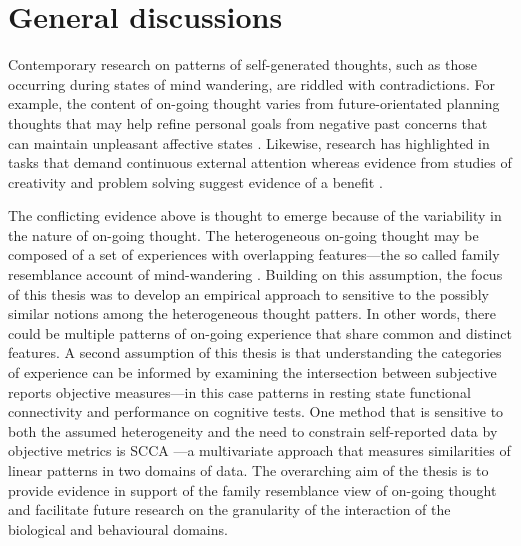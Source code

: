 \chapter{General discussions}
\label{ch:discussion}
Contemporary research on patterns of self-generated thoughts, such as those occurring during states of mind wandering, are riddled with contradictions. For example, the content of on-going thought varies from future-orientated planning thoughts that may help refine personal goals \cite{Medea2016} from negative past concerns that can maintain unpleasant affective states \cite{Killingsworth2010}. Likewise, research has highlighted in tasks that demand continuous external attention \cite{McVayJOEP2009,McVay2012} whereas evidence from studies of creativity and problem solving suggest evidence of a benefit \cite{Smeekens2016,Baird2012}. 

The conflicting evidence above is thought to emerge because of the variability in the nature of on-going thought. The heterogeneous on-going thought may be composed of a set of experiences with overlapping features---the so called family resemblance account of mind-wandering \cite{Smallwood2013, Seli2018}. Building on this assumption, the focus of this thesis was to develop an empirical approach to  sensitive to the possibly similar notions among the heterogeneous thought patters. In other words, there could be multiple patterns of on-going experience that share common and distinct features. 
A second assumption of this thesis is that understanding the categories of experience can be informed by examining the intersection between subjective reports objective measures---in this case patterns in resting state functional connectivity and performance on cognitive tests. One method that is sensitive to both the assumed heterogeneity and the need to constrain self-reported data by objective metrics is SCCA \cite{WittenSCCA2009}---a multivariate approach that measures similarities of linear patterns in two domains of data. The overarching aim of the thesis is to provide evidence in support of the family resemblance view of on-going thought and facilitate future research on the granularity of the interaction of the biological and behavioural domains.

